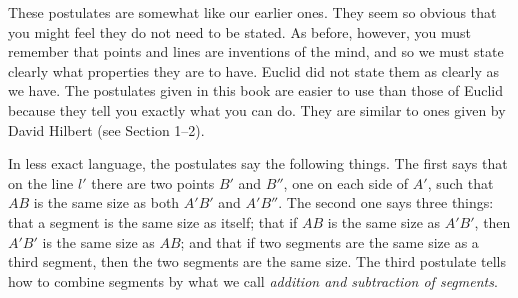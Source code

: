 \documentclass[11pt]{book}
\theoremstyle{bkplain}
\theoremstyle{XIplainnote}
\theoremstyle{bkplain}
\theoremstyle{bkplain}
\begin{document}
These postulates are somewhat like our earlier ones. They seem so obvious that
you might feel they do not need to be stated. As before, however, you must
remember that points and lines are inventions of the mind, and so we must state
clearly what properties they are to have. Euclid did not state them as clearly as
we have. The postulates given in this book are easier to use than those of Euclid
because they tell you exactly what you can do. They are similar to ones given by
David Hilbert (see Section 1--2).

In less exact language, the postulates say the following things. The first says
that on the line $l'$ there are two points $B'$ and $B''$, one on each side of
$A'$, such that $AB$ is the same size as both $A'B'$ and $A'B''$. The second one
says three things: that a segment is the same size as itself; that if $AB$ is the
same size as $A'B'$, then $A'B'$ is the same size as $AB$; and that if two
segments are the same size as a third segment, then the two segments are the same
size. The third postulate tells how to combine segments by what we call
\emph{addition and subtraction of segments}.

\end{document}
